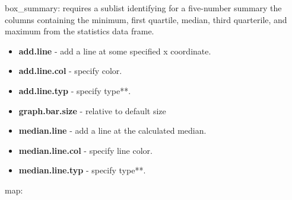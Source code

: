 \documentclass{article}
\begin{document}
box\_summary: requires a sublist identifying for a five-number summary the columns containing the minimum, first quartile, median, third quarterile, and maximum from the statistics data frame.
\begin{itemize}
\item \textbf{add.line} - add a line at some specified x coordinate.
\item \textbf{add.line.col} - specify color.
\item \textbf{add.line.typ} - specify type**.
\item \textbf{graph.bar.size} - relative to default size
\item \textbf{median.line} - add a line at the calculated median.
\item \textbf{median.line.col} - specify line color.
\item \textbf{median.line.typ} - specify type**.
\end{itemize}
map:
\end{document}
